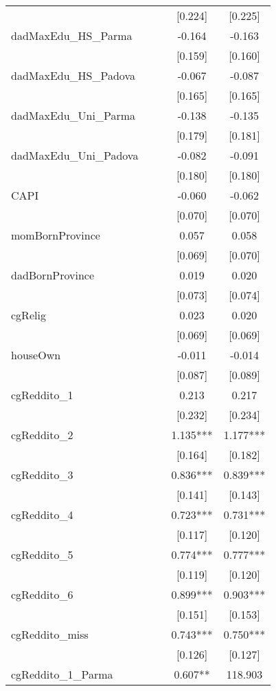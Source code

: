 \documentclass[]{article}
\begin{document}
\begin{tabular}{lcccc}
 &  &  & [0.224] & [0.225] \\
dadMaxEdu\_HS\_Parma &  &  & -0.164 & -0.163 \\
 &  &  & [0.159] & [0.160] \\
dadMaxEdu\_HS\_Padova &  &  & -0.067 & -0.087 \\
 &  &  & [0.165] & [0.165] \\
dadMaxEdu\_Uni\_Parma &  &  & -0.138 & -0.135 \\
 &  &  & [0.179] & [0.181] \\
dadMaxEdu\_Uni\_Padova &  &  & -0.082 & -0.091 \\
 &  &  & [0.180] & [0.180] \\
CAPI &  &  & -0.060 & -0.062 \\
 &  &  & [0.070] & [0.070] \\
momBornProvince &  &  & 0.057 & 0.058 \\
 &  &  & [0.069] & [0.070] \\
dadBornProvince &  &  & 0.019 & 0.020 \\
 &  &  & [0.073] & [0.074] \\
cgRelig &  &  & 0.023 & 0.020 \\
 &  &  & [0.069] & [0.069] \\
houseOwn &  &  & -0.011 & -0.014 \\
 &  &  & [0.087] & [0.089] \\
cgReddito\_1 &  &  & 0.213 & 0.217 \\
 &  &  & [0.232] & [0.234] \\
cgReddito\_2 &  &  & 1.135*** & 1.177*** \\
 &  &  & [0.164] & [0.182] \\
cgReddito\_3 &  &  & 0.836*** & 0.839*** \\
 &  &  & [0.141] & [0.143] \\
cgReddito\_4 &  &  & 0.723*** & 0.731*** \\
 &  &  & [0.117] & [0.120] \\
cgReddito\_5 &  &  & 0.774*** & 0.777*** \\
 &  &  & [0.119] & [0.120] \\
cgReddito\_6 &  &  & 0.899*** & 0.903*** \\
 &  &  & [0.151] & [0.153] \\
cgReddito\_miss &  &  & 0.743*** & 0.750*** \\
 &  &  & [0.126] & [0.127] \\
cgReddito\_1\_Parma &  &  & 0.607** & 118.903 \\

\end{tabular}
\end{document}
